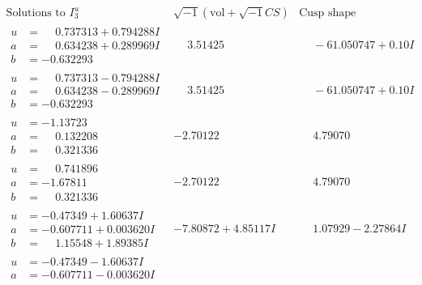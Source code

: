 \documentclass[1p]{elsarticle_modified}
\theoremstyle{definition}
\newcommand{\I}{\sqrt{-1}}
\begin{document}
$$\begin{array}{c|c|c}  
\text{Solutions to }I^u_{3}& \I (\text{vol} + \sqrt{-1}CS) & \text{Cusp shape}\\
 \hline 
\begin{aligned}
u &= \phantom{-}0.737313 + 0.794288 I \\
a &= \phantom{-}0.634238 + 0.289969 I \\
b &= -0.632293\phantom{ +0.000000I}\end{aligned}
 & \phantom{-}3.51425\phantom{ +0.000000I} & \phantom{-}                -6
1.050747 + 0. 10   I\phantom{ +0.000000I} \\ \hline\begin{aligned}
u &= \phantom{-}0.737313 - 0.794288 I \\
a &= \phantom{-}0.634238 - 0.289969 I \\
b &= -0.632293\phantom{ +0.000000I}\end{aligned}
 & \phantom{-}3.51425\phantom{ +0.000000I} & \phantom{-}                -6
1.050747 + 0. 10   I\phantom{ +0.000000I} \\ \hline\begin{aligned}
u &= -1.13723\phantom{ +0.000000I} \\
a &= \phantom{-}0.132208\phantom{ +0.000000I} \\
b &= \phantom{-}0.321336\phantom{ +0.000000I}\end{aligned}
 & -2.70122\phantom{ +0.000000I} & \phantom{-}4.79070\phantom{ +0.000000I} \\ \hline\begin{aligned}
u &= \phantom{-}0.741896\phantom{ +0.000000I} \\
a &= -1.67811\phantom{ +0.000000I} \\
b &= \phantom{-}0.321336\phantom{ +0.000000I}\end{aligned}
 & -2.70122\phantom{ +0.000000I} & \phantom{-}4.79070\phantom{ +0.000000I} \\ \hline\begin{aligned}
u &= -0.47349 + 1.60637 I \\
a &= -0.607711 + 0.003620 I \\
b &= \phantom{-}1.15548 + 1.89385 I\end{aligned}
 & -7.80872 + 4.85117 I & \phantom{-}1.07929 - 2.27864 I \\ \hline\begin{aligned}
u &= -0.47349 - 1.60637 I \\
a &= -0.607711 - 0.003620 I \\

\end{aligned}
\end{array}$$
\end{document}
